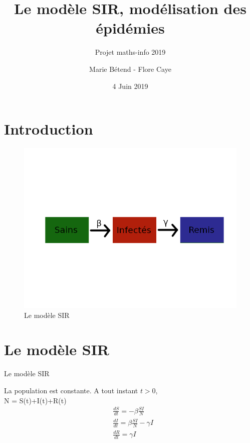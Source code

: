 \documentclass{beamer}
\theoremstyle{plain}
\theoremstyle{definition}
\theoremstyle{remark}
\begin{document}
\title{Le modèle SIR, modélisation des épidémies}
\subtitle{Projet maths-info 2019}
 \author{Marie Bétend - Flore Caye}
 \date{4 Juin 2019}
\begin{frame}
   \maketitle
\end{frame}
\section{Introduction}
\begin{frame}
    \begin{figure}[!h]
\begin{center}
   \includegraphics[scale= 1.2]{SIR.png}
   \end{center}
     \caption{Le modèle SIR}
\end{figure}
\end{frame}
\section{Le modèle SIR}
\begin{frame}{Le modèle SIR}
\begin{center}
La population est constante. A tout instant $t > 0$, \\ N = S(t)+I(t)+R(t)
\begin{align}
\label{dS}
&\frac{dS}{dt} = -\beta\frac{SI}{N} \\
\label{dI}
&\frac{dI}{dt} = \beta\frac{SI}{N} - \gamma I \\
\label{dR}  
&\frac{dR}{dt} = \gamma I 
\end{align}
\end{center}
\end{frame}
\end{document}
